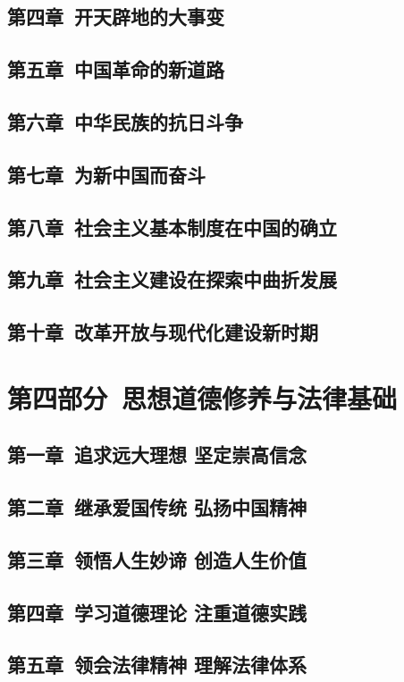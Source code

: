 \documentclass{ctexart}
\begin{document}
\subsection{第四章\ 开天辟地的大事变}
\subsection{第五章\ 中国革命的新道路}
\subsection{第六章\ 中华民族的抗日斗争}
\subsection{第七章\ 为新中国而奋斗}
\subsection{第八章\ 社会主义基本制度在中国的确立}
\subsection{第九章\ 社会主义建设在探索中曲折发展}
\subsection{第十章\ 改革开放与现代化建设新时期}

\section{第四部分\ 思想道德修养与法律基础}
\subsection{第一章\ 追求远大理想 坚定崇高信念}
\subsection{第二章\ 继承爱国传统 弘扬中国精神}
\subsection{第三章\ 领悟人生妙谛 创造人生价值}
\subsection{第四章\ 学习道德理论 注重道德实践}
\subsection{第五章\ 领会法律精神 理解法律体系}
\end{document}
